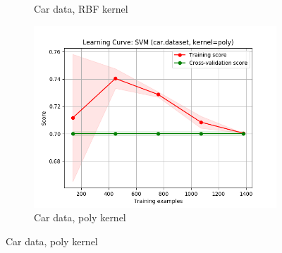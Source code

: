 \documentclass{article}
\begin{document}
\begin{figure}[htb]
\begin{subfigure}{0.33\textwidth}
      \caption{Car data, RBF kernel}
      \label{fig:svm-learning-2}
    \end{subfigure}\hfil
    \begin{subfigure}{0.33\textwidth}
      \includegraphics[width=\linewidth]{out/svm/car-kernel-poly.png}
      \caption{Car data, poly kernel}
      \label{fig:svm-learning-3}
    \end{subfigure}

    \medskip


\end{figure}
\end{document}
